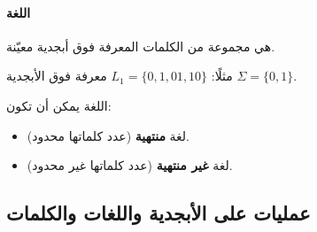 \documentclass[12pt]{article}
\begin{document}
\paragraph{اللغة} هي مجموعة من الكلمات المعرفة فوق أبجدية معيّنة.

مثلًا:
$L_1 = \{0, 1, 01, 10\}$ معرفة فوق الأبجدية $\Sigma = \{0, 1\}$.

اللغة يمكن أن تكون:
\begin{itemize}
    \item لغة \textbf{منتهية} (عدد كلماتها محدود).
    \item لغة \textbf{غير منتهية} (عدد كلماتها غير محدود).
\end{itemize}

\subsection{عمليات على الأبجدية واللغات والكلمات}
\end{document}
